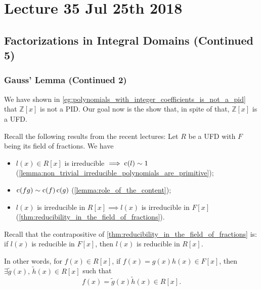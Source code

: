 \chapter{Lecture 35 Jul 25th 2018}%
\label{chp:lecture_35_jul_25th_2018}

\section{Factorizations in Integral Domains (Continued 5)}%
\label{sec:factorizations_in_integral_domains_continued_5}

\subsection{Gauss' Lemma (Continued 2)}%
\label{sub:gauss_lemma_continued_2}

We have shown in \cref{eg:polynomials_with_integer_coefficients_is_not_a_pid} that $\mathbb{Z}[x]$ is not a PID. Our goal now is the show that, in spite of that, $\mathbb{Z}[x]$ is a UFD.

\begin{note}
  Recall the following results from the recent lectures: Let $R$ be a UFD with $F$ being its field of fractions. We have
  \begin{itemize}
    \item $l(x) \in R[x]$ is irreducible $\implies \operatorname{c}(l) \sim 1$ (\cref{lemma:non_trivial_irreducible_polynomials_are_primitive});
    \item $\operatorname{c}(fg) \sim \operatorname{c}(f) \operatorname{c}(g)$ (\cref{lemma:role_of_the_content});
    \item $l(x)$ is irreducible in $R[x] \implies l(x)$ is irreducible in $F[x]$\\ (\cref{thm:reducibility_in_the_field_of_fractions}).
  \end{itemize}
\end{note}

\begin{note}
  Recall that the contrapositive of \cref{thm:reducibility_in_the_field_of_fractions} is: if $l(x)$ is reducible in $F[x]$, then $l(x)$ is reducible in $R[x]$.

  In other words, for $f(x) \in R[x]$, if $f(x) = g(x) h(x) \in F[x]$, then $\exists \tilde{g}(x), \, \tilde{h}(x) \in R[x]$ such that
  \begin{equation*}
    f(x) = \tilde{g}(x) \tilde{h}(x) \in R[x].
  \end{equation*}
\end{note}

